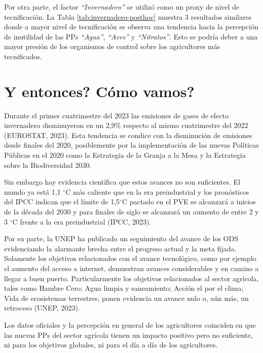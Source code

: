 \documentclass[a4paper, nobind]{templates/ociamthesis}
\begin{document}
Por otra parte, el factor \emph{``Invernadero''} se utilizó como un proxy de nivel de tecnificación.
La Tabla \ref{tab:invernadero-posthoc} muestra 3 resultados similares donde a mayor nivel de tecnificación se observa una tendencia hacia la percepción de inutilidad de las PPs \emph{``Agua''}, \emph{``Aves''} y \emph{``Nitratos''}.
Esto se podría deber a una mayor presión de los organismos de control sobre los agricultores más tecnificados.

\hypertarget{y-entonces-cuxf3mo-vamos}{%
\section{\texorpdfstring{\textquestiondown Y entonces? \textquestiondown Cómo vamos?}{Y entonces? Cómo vamos?}}\label{y-entonces-cuxf3mo-vamos}}

Durante el primer cuatrimestre del 2023 las emisiones de gases de efecto invernadero disminuyeron en un 2,9\% respecto al mismo cuatrimestre del 2022 (EUROSTAT, 2023).
Esta tendencia se condice con la disminución de emisiones desde finales del 2020, posiblemente por la implementación de las nuevas Políticas Públicas en el 2020 como la Estrategia de la Granja a la Mesa y la Estrategia sobre la Biodiversidad 2030.

Sin embargo hay evidencia científica que estos avances no son suficientes.
El mundo ya está 1,1 \(^{\circ}\)C más caliente que en la era preindustrial y los pronósticos del IPCC indican que el límite de 1,5\(^{\circ}\)C pactado en el PVE se alcanzará a inicios de la década del 2030 y para finales de siglo se alcanzará un aumento de entre 2 y 3 \(^{\circ}\)C frente a la era preindustrial (IPCC, 2023).

Por su parte, la UNEP ha publicado un seguimiento del avance de los ODS evidenciando la alarmante brecha entre el progreso actual y la meta fijada. Solamente los objetivos relacionados con el avance tecnológico, como por ejemplo el aumento del acceso a internet, demuestran avances considerables y en camino a llegar a buen puerto.
Particularmente los objetivos relacionados al sector agrícola, tales como Hambre Cero; Agua limpia y saneamiento; Acción el por el clima; Vida de ecosistemas terrestres, ponen evidencia un avance nulo o, aún más, un retroceso (UNEP, 2023).

Los datos oficiales y la percepción en general de los agricultores coinciden en que las nuevas PPs del sector agrícola tienen un impacto positivo pero no suficiente, ni para los objetivos globales, ni para el día a día de los agricultores.
\end{document}

